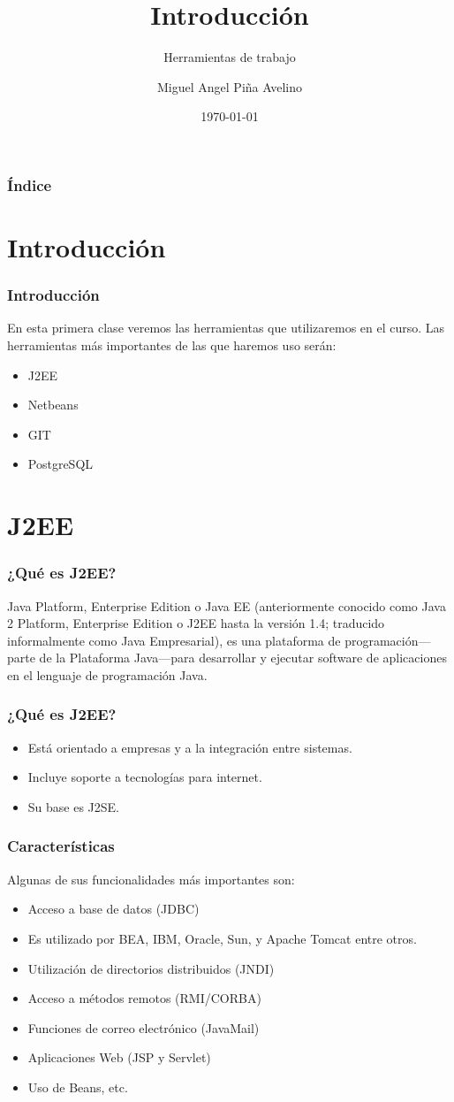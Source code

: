 \documentclass{beamer}
\title[Laboratorio]{Introducción}
\subtitle{Herramientas de trabajo}
\author[Miguel]{Miguel Angel Piña Avelino}
\institute[UNAM]{
  Facultad de Ciencias, UNAM
}
\date{\today}
\begin{document}
\frame{\titlepage}

\begin{frame}
  \frametitle{Índice}
  \tableofcontents
\end{frame}

\section{Introducción}
\begin{frame}
  \frametitle{Introducción}
  En esta primera clase veremos las herramientas que utilizaremos en el curso.
  Las herramientas más importantes de las que haremos uso serán:
  \begin{itemize}
    \item J2EE
    \item Netbeans
    \item GIT
    \item PostgreSQL
  \end{itemize}
\end{frame}
\section{J2EE}

\begin{frame}
  \frametitle{¿Qué es J2EE?}
  Java Platform, Enterprise Edition o Java EE (anteriormente conocido como Java
  2 Platform, Enterprise Edition o J2EE hasta la versión 1.4; traducido
  informalmente como Java Empresarial), es una plataforma de programación—parte
  de la Plataforma Java—para desarrollar y ejecutar software de aplicaciones en
  el lenguaje de programación Java.
\end{frame}

\begin{frame}
  \frametitle{¿Qué es J2EE?}
  \begin{itemize}
    \item Está orientado a empresas y a la integración entre sistemas.
    \item Incluye soporte a tecnologías para internet.
    \item Su base es J2SE.
  \end{itemize}
\end{frame}

\begin{frame}
  \frametitle{Características}
    Algunas de sus funcionalidades más importantes son:
  \begin{itemize}
    \item Acceso a base de datos (JDBC)
    \item Es utilizado por BEA, IBM, Oracle, Sun, y Apache Tomcat entre otros.
    \item Utilización de directorios distribuidos (JNDI)
    \item Acceso a métodos remotos (RMI/CORBA)
    \item Funciones de correo electrónico (JavaMail)
    \item Aplicaciones Web (JSP y Servlet)
    \item Uso de Beans, etc.
  \end{itemize}
\end{frame}
\end{document}

